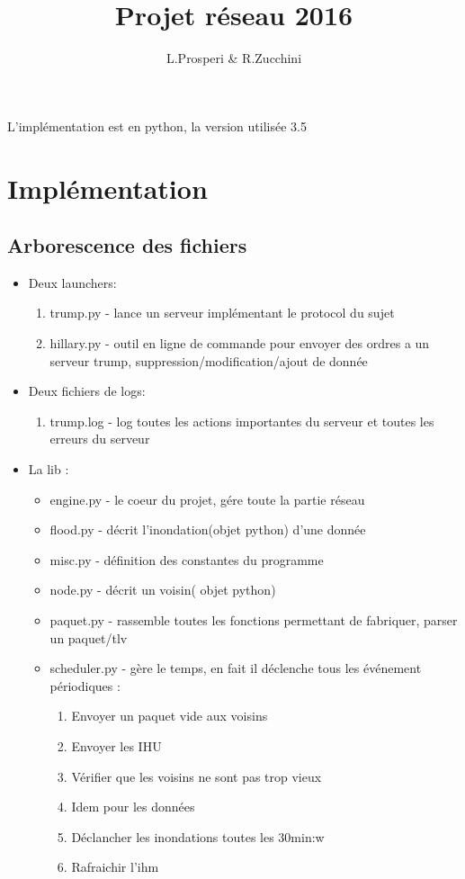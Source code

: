 \documentclass{article}
\begin{document}
\title{Projet réseau 2016}
\author{L.Prosperi \& R.Zucchini}

\maketitle

\abstractname{L'implémentation est en python, la version utilisée 3.5}

\section{Implémentation}
\subsection{Arborescence des fichiers}
\begin{itemize}
 \item Deux launchers:
 \begin{enumerate}
  \item trump.py - lance un serveur implémentant le protocol du sujet
  \item hillary.py - outil en ligne de commande pour envoyer des ordres a un serveur trump,
    suppression/modification/ajout de donnée
 \end{enumerate}
 \item Deux fichiers de logs:
 \begin{enumerate}
  \item trump.log - log toutes les actions importantes du serveur et 
  toutes les erreurs du serveur
 \end{enumerate}

 \item La lib :
 \begin{itemize}
  \item engine.py - le coeur du projet, gére toute la partie réseau 
  \item flood.py - décrit l'inondation(objet python) d'une donnée
  \item misc.py - définition des constantes du programme
  \item node.py - décrit un voisin( objet python)
  \item paquet.py - rassemble toutes les fonctions permettant de fabriquer, parser un paquet/tlv
  \item scheduler.py - gère le temps, en fait il déclenche tous les événement périodiques :
  \begin{enumerate}
   \item Envoyer un paquet vide aux voisins
   \item Envoyer les IHU
   \item Vérifier que les voisins ne sont pas trop vieux
   \item Idem pour les données
   \item Déclancher les inondations toutes les 30min:w
   \item Rafraichir l'ihm
  \end{enumerate}


\end{itemize}
\end{itemize}
\end{document}
